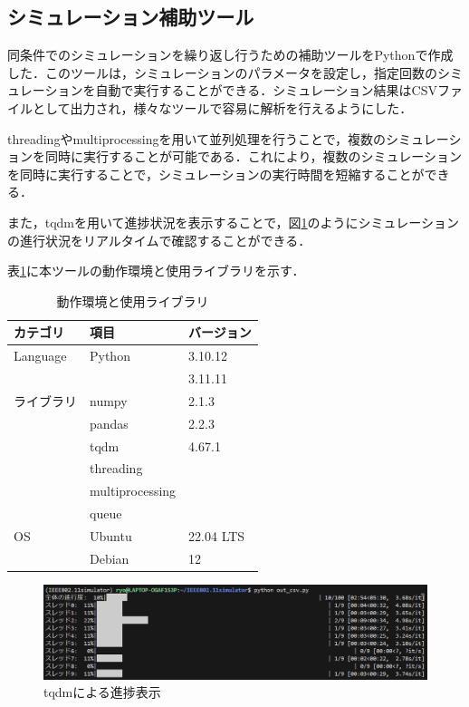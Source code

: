 \documentclass[a4paper,10pt]{ltjsarticle}
\begin{document}
\clearpage

\subsection{シミュレーション補助ツール}
同条件でのシミュレーションを繰り返し行うための補助ツールをPythonで作成した．このツールは，シミュレーションのパラメータを設定し，指定回数のシミュレーションを自動で実行することができる．シミュレーション結果はCSVファイルとして出力され，様々なツールで容易に解析を行えるようにした．

threadingやmultiprocessingを用いて並列処理を行うことで，複数のシミュレーションを同時に実行することが可能である．これにより，複数のシミュレーションを同時に実行することで，シミュレーションの実行時間を短縮することができる．

また，tqdmを用いて進捗状況を表示することで，図\ref{tqdm}のようにシミュレーションの進行状況をリアルタイムで確認することができる．

表\ref{tab:env_tool}に本ツールの動作環境と使用ライブラリを示す．

\begin{table}[H]
  \centering
  \caption{動作環境と使用ライブラリ}
  \label{tab:env_tool}
  \begin{tabular}{l|l|l}
      \hline
      カテゴリ & 項目 & バージョン \\ \hline
      Language           & Python        & 3.10.12 \\ 
      &               & 3.11.11 \\ \hline
      ライブラリ       & numpy         & 2.1.3\\ 
                      & pandas    & 2.2.3\\
                      & tqdm      & 4.67.1\\
                      & threading & \\
                      &multiprocessing & \\
                      & queue   & \\\hline
      OS               & Ubuntu        & 22.04 LTS \\ 
                       & Debian        & 12 \\ \hline
  \end{tabular}
\end{table}


\begin{figure}[H]
  \centering
  \includegraphics[width=\textwidth]{./assets/tqdm.png}
  \caption{tqdmによる進捗表示}
  \label{tqdm}
\end{figure}
\end{document}
